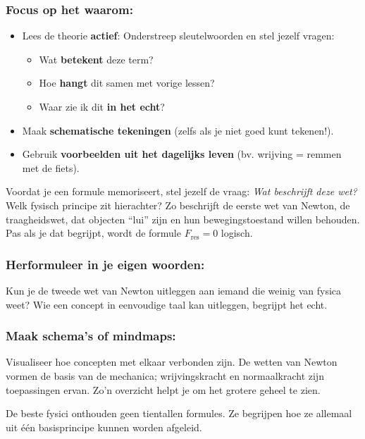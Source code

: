 {\subsubsection*{Focus op het waarom:}  
\begin{itemize}
    \item Lees de theorie \textbf{actief}: Onderstreep sleutelwoorden en stel jezelf vragen:
    \begin{itemize}
        \item Wat \textbf{betekent} deze term?
        \item Hoe \textbf{hangt} dit samen met vorige lessen?
        \item Waar zie ik dit \textbf{in het echt}?
    \end{itemize}
    \item Maak \textbf{schematische tekeningen} (zelfs als je niet goed kunt tekenen!).
    \item Gebruik \textbf{voorbeelden uit het dagelijks leven} (bv. wrijving = remmen met de fiets).
\end{itemize}
Voordat je een formule memoriseert, stel jezelf de vraag: \textit{Wat beschrijft deze wet?}  
Welk fysisch principe zit hierachter?  
Zo beschrijft de eerste wet van Newton, de traagheidswet, dat objecten “lui” zijn en hun bewegingstoestand willen behouden.  
Pas als je dat begrijpt, wordt de formule $F_{\text{res}} = 0$ logisch.


\subsubsection*{Herformuleer in je eigen woorden:}
Kun je de tweede wet van Newton uitleggen aan iemand die weinig van fysica weet?  
Wie een concept in eenvoudige taal kan uitleggen, begrijpt het echt.

\subsubsection*{Maak schema’s of mindmaps:}
Visualiseer hoe concepten met elkaar verbonden zijn.  
De wetten van Newton vormen de basis van de mechanica; wrijvingskracht en normaalkracht zijn toepassingen ervan.  
Zo’n overzicht helpt je om het grotere geheel te zien.

\begin{opm}
De beste fysici onthouden geen tientallen formules. Ze begrijpen hoe ze allemaal uit één basisprincipe kunnen worden afgeleid.
\end{opm}

}
